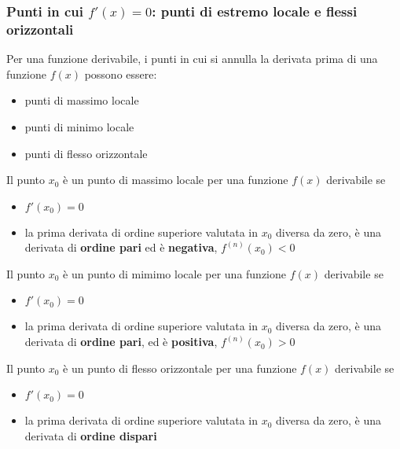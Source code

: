 \subsubsection{Punti in cui $f'(x) = 0$: punti di estremo locale e flessi orizzontali}
Per una funzione derivabile, i punti in cui si annulla la derivata prima di una funzione $f(x)$ possono essere:
\begin{itemize}
    \item punti di massimo locale
    \item punti di minimo locale
    \item punti di flesso orizzontale
\end{itemize}
\begin{definition}
\end{definition}
\begin{theorem} Il punto $x_0$ è un punto di massimo locale per una funzione $f(x)$ derivabile se
    \begin{itemize}
        \item $f'(x_0) = 0$
        \item la prima derivata di ordine superiore valutata in $x_0$ diversa da zero, è una derivata di \textbf{ordine pari} ed è \textbf{negativa}, $f^{(n)}(x_0) < 0$
    \end{itemize}
\end{theorem}
\begin{definition}
\end{definition}
\begin{theorem} Il punto $x_0$ è un punto di mimimo locale per una funzione $f(x)$ derivabile se
    \begin{itemize}
        \item $f'(x_0) = 0$
        \item la prima derivata di ordine superiore valutata in $x_0$ diversa da zero, è una derivata di \textbf{ordine pari}, ed è \textbf{positiva}, $f^{(n)}(x_0) > 0$
    \end{itemize}
\end{theorem}
\begin{definition}
\end{definition}
\begin{theorem} Il punto $x_0$ è un punto di flesso orizzontale per una funzione $f(x)$ derivabile se
    \begin{itemize}
        \item $f'(x_0) = 0$
        \item la prima derivata di ordine superiore valutata in $x_0$ diversa da zero, è una derivata di \textbf{ordine dispari}
    \end{itemize}
\end{theorem}

